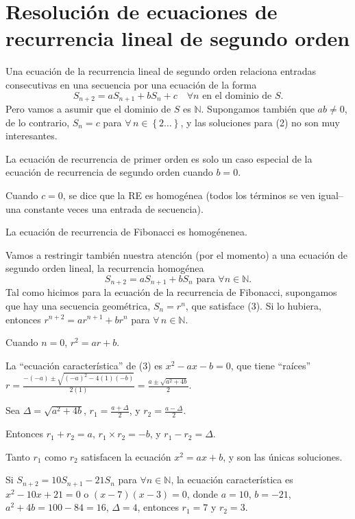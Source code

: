 \section{Resolución de ecuaciones de recurrencia lineal de segundo orden}

Una ecuación de la recurrencia lineal de segundo orden relaciona entradas consecutivas en una secuencia por una ecuación de la forma
\begin{equation}
	S_{n+2}=aS_{n+1}+bS_{n}+c\quad\forall n\text{ en el dominio de }S.
\end{equation}
Pero vamos a asumir que el dominio de $S$ es $\mathds{N}$. Supongamos también que $ab\neq0$, de lo contrario, $S_{n}=c$ para $\forall\,n \in\left\{2\ldots\right\}$, y las soluciones para (2) no son muy interesantes.

La ecuación de recurrencia de primer orden es solo un caso especial de la ecuación de recurrencia de segundo orden cuando $b = 0$.

Cuando $c=0$, se dice que la RE es homogénea (todos los términos se ven igual–una constante veces una entrada de secuencia).

La ecuación de recurrencia de Fibonacci es homogénenea.

Vamos a restringir también nuestra atención (por el momento) a una ecuación de segundo orden lineal, la recurrencia homogénea
\begin{equation}
	S_{n+2}=aS_{n+1}+bS_{n}\text{ para }\forall n\in\mathds{N}.
\end{equation}
Tal como hicimos para la ecuación de la recurrencia de Fibonacci, supongamos que
hay una secuencia geométrica, $S_n=r^n$, que satisface (3). Si lo hubiera, entonces $r^{n+2}=ar^{n+1}+br^{n}$ para $\forall\,n\in\mathds{N}$.

Cuando $n = 0$, $r^2=ar+b$.

La ``ecuación característica'' de (3) es $x^2-ax-b=0$, que tiene ``raíces'' $r=\tfrac{-(-a)\pm\sqrt{(-a)^2-4(1)(-b)}}{2(1)}=\tfrac{a\pm\sqrt{a^2+4b}}{2}$.

Sea $\Delta=\sqrt{a^2+4b}$, $r_1=\tfrac{a+\Delta}{2}$, y $r_2=\frac{a-\Delta}{2}$.

Entonces $r_{1}+r_{2}=a$, $r_{1}\times r_{2}=-b$, y $r_{1}-r_{2}=\Delta$.

Tanto $r_{1}$ como $r_{2}$ satisfacen la ecuación $x^{2}=ax+b$, y son las únicas soluciones.

\begin{example}{}
Si $S_{n+2}=10S_{n+1}-21S_n$ para $\forall n\in\mathds{N}$, la ecuación característica es $x^{2}-10x+21=0$ o $(x-7)(x-3)=0$, donde $a=10$, $b=-21$, $a^2+4b=100-84=16$, $\Delta = 4$, entonces $r_{1}=7$ y $r_{2}=3$.
\end{example}

